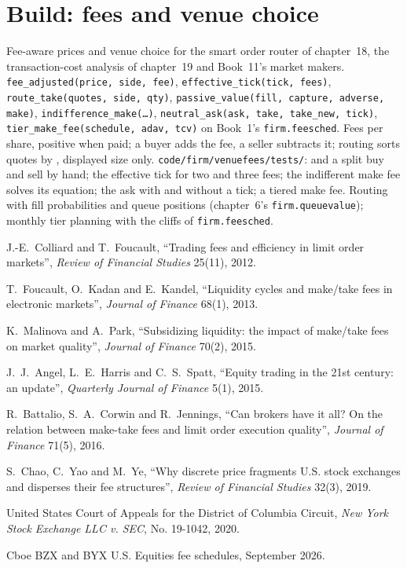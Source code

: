 \section{Build: fees and venue choice}\label{bld:mx:fees-rebates-and-venue-economics:venuefees}

\begin{build}
 Fee-aware prices and venue choice for the smart order router of chapter~18, the transaction-cost analysis of chapter~19 and
Book~11's market makers.
 \texttt{fee\_adjusted(price, side, fee)}, \texttt{effective\_tick(tick, fees)}, \texttt{route\_take(quotes, side, qty)},
\texttt{passive\_value(fill, capture, adverse, make)}, \texttt{indifference\_make(\dots)}, \texttt{neutral\_ask(ask, take, take\_new, tick)},
\texttt{tier\_make\_fee(schedule, adav, tcv)} on Book~1's \texttt{firm.feesched}.
 Fees per share, positive when paid; a buyer adds the fee, a seller subtracts it; routing sorts quotes by , displayed
size only.
 \texttt{code/firm/venuefees/tests/}:  and a split buy and sell by hand; the effective tick for two and
three fees; the indifferent make fee solves its equation; the  ask with and without a tick; a tiered make fee.
 Routing with fill probabilities and queue positions (chapter~6's \texttt{firm.queuevalue}); monthly tier planning with the cliffs of
\texttt{firm.feesched}.
\end{build}

\begin{omsources}
\item J.-E.~Colliard and T.~Foucault, ``Trading fees and efficiency in limit order markets'', \emph{Review of Financial Studies} 25(11), 2012.
\item T.~Foucault, O.~Kadan and E.~Kandel, ``Liquidity cycles and make/take fees in electronic markets'', \emph{Journal of Finance} 68(1), 2013.
\item K.~Malinova and A.~Park, ``Subsidizing liquidity: the impact of make/take fees on market quality'', \emph{Journal of Finance} 70(2), 2015.
\item J.~J.~Angel, L.~E.~Harris and C.~S.~Spatt, ``Equity trading in the 21st century: an update'', \emph{Quarterly Journal of Finance} 5(1), 2015.
\item R.~Battalio, S.~A.~Corwin and R.~Jennings, ``Can brokers have it all? On the relation between make-take fees and limit order execution quality'',
\emph{Journal of Finance} 71(5), 2016.
\item S.~Chao, C.~Yao and M.~Ye, ``Why discrete price fragments U.S. stock exchanges and disperses their fee structures'', \emph{Review of Financial
Studies} 32(3), 2019.
\item United States Court of Appeals for the District of Columbia Circuit, \emph{New York Stock Exchange LLC v. SEC}, No. 19-1042, 2020.
\item Cboe BZX and BYX U.S. Equities fee schedules, September 2026.
\end{omsources}

